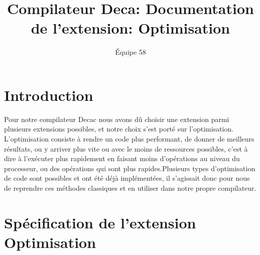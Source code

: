\documentclass[a4paper]{article}
\begin{document}
\title{Compilateur Deca: Documentation de l'extension: Optimisation}
\author{\'Equipe 58}
\maketitle
\section{Introduction}
Pour notre compilateur Decac nous avons dû choisir une extension parmi plusieurs extensions possibles, et notre choix s'est porté sur l'optimisation. L'optimisation consiste à rendre un code plus performant, de donner de meilleurs résultats, ou y arriver plus vite ou avec le moins de ressources possibles, c'est à dire à l'exécuter plus rapidement en faisant moins d'opérations au niveau du processeur, ou des opérations qui sont plus rapides.Plusieurs types d'optimisation de code sont possibles et ont été déjà implémentées, il s'agissait donc pour nous de reprendre ces méthodes classiques et en utiliser dans notre propre compilateur.
\section{Spécification de l'extension Optimisation}
\end{document}
